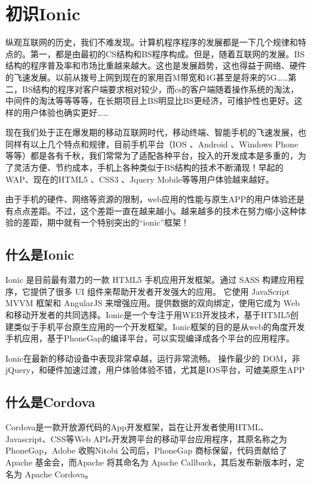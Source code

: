 \chapter{初识Ionic}

纵观互联网的历史，我们不难发现。计算机程序程序的发展都是一下几个规律和特点的。第一，都是由最初的CS结构和BS程序构成。但是，随着互联网的发展。BS结构的程序普及率和市场比重越来越大。这也是发展趋势，这也得益于网络、硬件的飞速发展。以前从拨号上网到现在的家用百M带宽和4G甚至是将来的5G……第二，BS结构的程序对客户端要求相对较少，而cs的客户端随着操作系统的淘汰，中间件的淘汰等等等等，在长期项目上BS明显比BS更经济，可维护性也更好。这样的用户体验也确实更好……

现在我们处于正在爆发期的移动互联网时代，移动终端、智能手机的飞速发展，也同样有以上几个特点和规律，目前手机平台（IOS 、Android 、Windows Phone 等等）都是各有千秋，我们常常为了适配各种平台，投入的开发成本是多重的，为了灵活方便、节约成本，手机上各种类似于BS结构的技术不断涌现！早起的WAP、现在的HTML5 、CSS3 、Jquery Mobile等等用户体验越来越好。

由于手机的硬件、网络等资源的限制，web应用的性能与原生APP的用户体验还是有点点差距。不过，这个差距一直在越来越小。越来越多的技术在努力缩小这种体验的差距，期中就有一个特别突出的“ionic”框架！

\section{什么是Ionic}

Ionic 是目前最有潜力的一款 HTML5 手机应用开发框架。通过 SASS 构建应用程序，它提供了很多 UI 组件来帮助开发者开发强大的应用。 它使用 JavaScript MVVM 框架和 AngularJS 来增强应用。提供数据的双向绑定，使用它成为 Web 和移动开发者的共同选择。Ionic是一个专注于用WEB开发技术，基于HTML5创建类似于手机平台原生应用的一个开发框架。Ionic框架的目的是从web的角度开发手机应用，基于PhoneGap的编译平台，可以实现编译成各个平台的应用程序。

Ionic在最新的移动设备中表现非常卓越，运行非常流畅。 操作最少的 DOM，非 jQuery，和硬件加速过渡，用户体验体验不错，尤其是IOS平台，可媲美原生APP

\section{什么是Cordova}
Cordova是一款开放源代码的App开发框架，旨在让开发者使用HTML、Javascript、CSS等Web APIs开发跨平台的移动平台应用程序，其原名称之为 PhoneGap，Adobe 收购Nitobi 公司后，PhoneGap 商标保留，代码贡献给了 Apache 基金会，而Apache 将其命名为 Apache Callback，其后发布新版本时，定名为 Apache Cordova。

